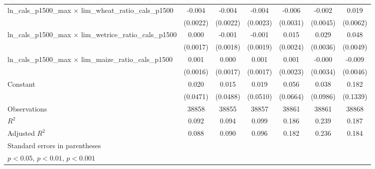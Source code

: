 {\begin{tabular}{l*{6}{c}}
\addlinespace
ln\_cals\_p1500\_max $\times$ lim\_wheat\_ratio\_cals\_p1500&      -0.004         &      -0.004         &      -0.004         &      -0.006         &      -0.002         &       0.019\sym{**} \\
                    &    (0.0022)         &    (0.0022)         &    (0.0023)         &    (0.0031)         &    (0.0045)         &    (0.0062)         \\
\addlinespace
ln\_cals\_p1500\_max $\times$ lim\_wetrice\_ratio\_cals\_p1500&       0.000         &      -0.001         &      -0.001         &       0.015\sym{***}&       0.029\sym{***}&       0.048\sym{***}\\
                    &    (0.0017)         &    (0.0018)         &    (0.0019)         &    (0.0024)         &    (0.0036)         &    (0.0049)         \\
\addlinespace
ln\_cals\_p1500\_max $\times$ lim\_maize\_ratio\_cals\_p1500&       0.001         &       0.000         &       0.001         &       0.001         &      -0.000         &      -0.009\sym{*}  \\
                    &    (0.0016)         &    (0.0017)         &    (0.0017)         &    (0.0023)         &    (0.0034)         &    (0.0046)         \\
\addlinespace
Constant            &       0.020         &       0.015         &       0.019         &       0.056         &       0.038         &       0.182         \\
                    &    (0.0471)         &    (0.0488)         &    (0.0510)         &    (0.0664)         &    (0.0986)         &    (0.1339)         \\
\midrule
Observations        &       38858         &       38855         &       38857         &       38861         &       38861         &       38868         \\
\(R^{2}\)           &       0.092         &       0.094         &       0.099         &       0.186         &       0.239         &       0.187         \\
Adjusted \(R^{2}\)  &       0.088         &       0.090         &       0.096         &       0.182         &       0.236         &       0.184         \\
\bottomrule
\multicolumn{7}{l}{\footnotesize Standard errors in parentheses}\\
\multicolumn{7}{l}{\footnotesize \sym{*} \(p<0.05\), \sym{**} \(p<0.01\), \sym{***} \(p<0.001\)}\\
\end{tabular}
}
